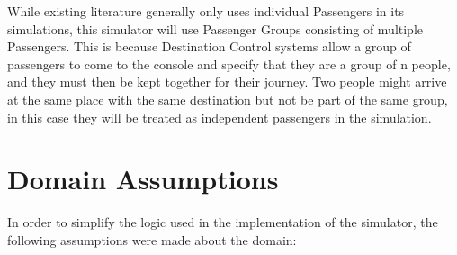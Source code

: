 \documentclass{UoYCSproject}
\begin{document}
While existing literature generally only uses individual Passengers in its simulations, this simulator will use Passenger Groups consisting of multiple Passengers.  This is because Destination Control systems allow a group of passengers to come to the console and specify that they are a group of n people, and they must then be kept together for their journey.  Two people might arrive at the same place with the same destination but not be part of the same group, in this case they will be treated as independent passengers in the simulation.

\section{Domain Assumptions}

In order to simplify the logic used in the implementation of the simulator, the following assumptions were made about the domain:
\end{document}
